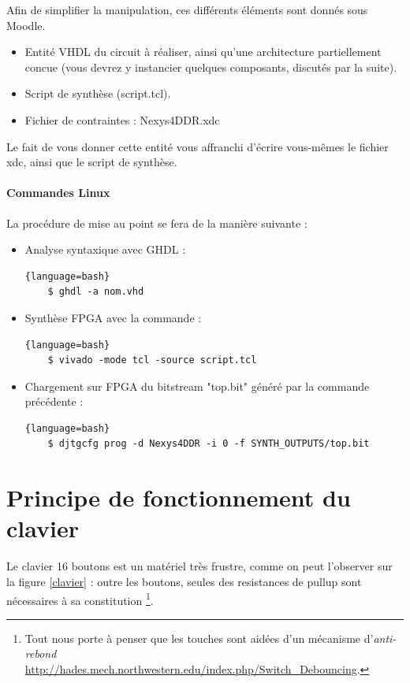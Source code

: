 \documentclass[a4paper,11pt]{article}
\begin{document}
Afin de simplifier la manipulation, ces différents éléments sont donnés sous Moodle.
\begin{itemize}
  \item Entité VHDL du circuit à réaliser, ainsi qu'une architecture partiellement concue (vous devrez y instancier quelques composants, discutés par la suite).
  \item Script de synthèse (script.tcl).
  \item Fichier de contraintes : Nexys4DDR.xdc
\end{itemize}

Le fait de vous donner cette entité vous affranchi d'écrire vous-mêmes le fichier xdc, ainsi que le script de synthèse.\\

\paragraph{Commandes Linux}

La procédure de mise au point se fera de la manière suivante :
\begin{itemize}
  \item Analyse syntaxique avec GHDL :
  \begin{lstlisting}{language=bash}
    $ ghdl -a nom.vhd
  \end{lstlisting}
  \item Synthèse FPGA avec la commande :
  \begin{lstlisting}{language=bash}
    $ vivado -mode tcl -source script.tcl
  \end{lstlisting}
  \item Chargement sur FPGA du bitstream "top.bit" généré par la commande précédente :
  \begin{lstlisting}{language=bash}
    $ djtgcfg prog -d Nexys4DDR -i 0 -f SYNTH_OUTPUTS/top.bit
  \end{lstlisting}
\end{itemize}


\section{Principe de fonctionnement du clavier}
Le clavier 16 boutons est un matériel très frustre, comme on peut l'observer sur la figure \ref{clavier} :
outre les boutons, seules des resistances de pullup sont nécessaires à sa constitution \footnote{Tout nous porte à penser que les touches sont aidées d'un mécanisme
d'{\it anti-rebond} \url{http://hades.mech.northwestern.edu/index.php/Switch_Debouncing}.}.
\end{document}
